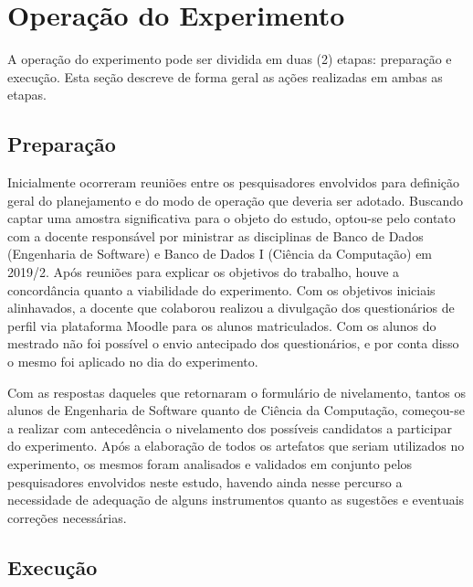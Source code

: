 \section{Operação do Experimento} \label{ssec:operacaoExp}

A operação do experimento pode ser dividida em duas (2) etapas: preparação e execução.
Esta seção descreve de forma geral as ações realizadas em ambas as etapas.

\subsection{Preparação}

Inicialmente ocorreram reuniões entre os pesquisadores envolvidos para definição geral do planejamento e do modo de operação que deveria ser adotado.
Buscando captar uma amostra significativa para o objeto do estudo, optou-se pelo contato com a docente responsável por ministrar as disciplinas de Banco de Dados (Engenharia de Software) e Banco de Dados I (Ciência da Computação) em 2019/2.
Após reuniões para explicar os objetivos do trabalho, houve a concordância quanto a viabilidade do experimento.
Com os objetivos iniciais alinhavados, a docente que colaborou realizou a divulgação dos questionários de perfil via plataforma Moodle para os alunos matriculados.
Com os alunos do mestrado não foi possível o envio antecipado dos questionários, e por conta disso o mesmo foi aplicado no dia do experimento.

Com as respostas daqueles que retornaram o formulário de nivelamento, tantos os alunos de Engenharia de Software quanto de Ciência da Computação, começou-se a realizar com antecedência o nivelamento dos possíveis candidatos a participar do experimento.
Após a elaboração de todos os artefatos que seriam utilizados no experimento, os mesmos foram analisados e validados em conjunto pelos pesquisadores envolvidos neste estudo, havendo ainda nesse percurso a necessidade de adequação de alguns instrumentos quanto as sugestões e eventuais correções necessárias.

\subsection{Execução}


